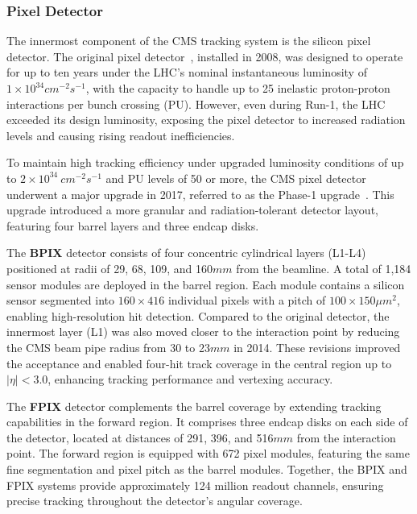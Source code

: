 \subsubsection{Pixel Detector}

The innermost component of the CMS tracking system is the silicon pixel detector. The original pixel detector~\cite{LHC_CMS}, installed in 2008, was designed to operate for up to ten years under the LHC’s nominal instantaneous luminosity of $1 \times 10^{34}\unit{cm}^{-2}\unit{s}^{-1}$, with the capacity to handle up to 25 inelastic proton-proton interactions per bunch crossing (PU). However, even during Run-1, the LHC exceeded its design luminosity, exposing the pixel detector to increased radiation levels and causing rising readout inefficiencies.

To maintain high tracking efficiency under upgraded luminosity conditions of up to $2 \times 10^{34}~\unit{cm}^{-2}\unit{s}^{-1}$ and PU levels of 50 or more, the CMS pixel detector underwent a major upgrade in 2017, referred to as the Phase-1 upgrade~\cite{CMS_Detector_Run3, CMS_Tracker_Phase1_Upgrade}. This upgrade introduced a more granular and radiation-tolerant detector layout, featuring four barrel layers and three endcap disks.

The \textbf{\ac{BPIX}} detector consists of four concentric cylindrical layers (L1-L4) positioned at radii of 29, 68, 109, and 160$\unit{mm}$ from the beamline. A total of 1,184 sensor modules are deployed in the barrel region. Each module contains a silicon sensor segmented into $160 \times 416$ individual pixels with a pitch of $100 \times 150\unit{\mu m}^2$, enabling high-resolution hit detection. Compared to the original detector, the innermost layer (L1) was also moved closer to the interaction point by reducing the CMS beam pipe radius from 30 to 23$\unit{mm}$ in 2014. These revisions improved the acceptance and enabled four-hit track coverage in the central region up to $|\eta| < 3.0$, enhancing tracking performance and vertexing accuracy.

The \textbf{\ac{FPIX}} detector complements the barrel coverage by extending tracking capabilities in the forward region. It comprises three endcap disks on each side of the detector, located at distances of 291, 396, and 516$\unit{mm}$ from the interaction point. The forward region is equipped with 672 pixel modules, featuring the same fine segmentation and pixel pitch as the barrel modules. Together, the BPIX and FPIX systems provide approximately 124 million readout channels, ensuring precise tracking throughout the detector’s angular coverage.


